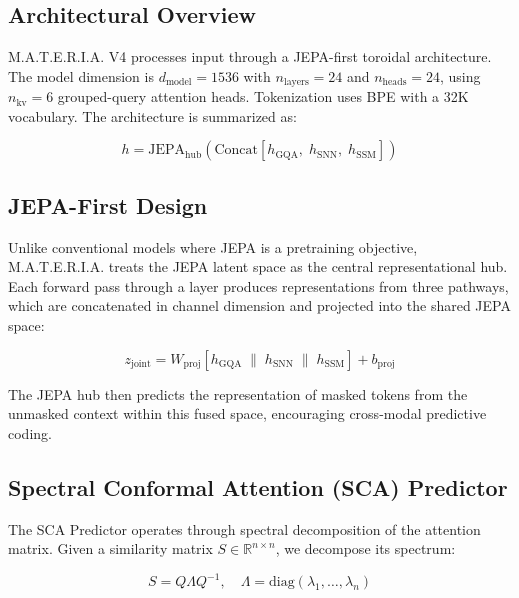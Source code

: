 \documentclass[conference]{IEEEtran}
\newcommand{\materia}{\textsc{M.A.T.E.R.I.A.}}
\begin{document}
\subsection{Architectural Overview}

\materia{} V4 processes input through a JEPA-first toroidal architecture. The model dimension is $d_{\text{model}} = 1536$ with $n_{\text{layers}} = 24$ and $n_{\text{heads}} = 24$, using $n_{\text{kv}} = 6$ grouped-query attention heads. Tokenization uses BPE with a 32K vocabulary. The architecture is summarized as:

\begin{equation}
h = \text{JEPA}_{\text{hub}}\left(\text{Concat}\left[h_{\text{GQA}},\; h_{\text{SNN}},\; h_{\text{SSM}}\right]\right)
\end{equation}

\subsection{JEPA-First Design}

Unlike conventional models where JEPA is a pretraining objective, \materia{} treats the JEPA latent space as the central representational hub. Each forward pass through a layer produces representations from three pathways, which are concatenated in channel dimension and projected into the shared JEPA space:

\begin{equation}
z_{\text{joint}} = W_{\text{proj}}\left[h_{\text{GQA}} \;\|\; h_{\text{SNN}} \;\|\; h_{\text{SSM}}\right] + b_{\text{proj}}
\end{equation}

The JEPA hub then predicts the representation of masked tokens from the unmasked context within this fused space, encouraging cross-modal predictive coding.

\subsection{Spectral Conformal Attention (SCA) Predictor}

The SCA Predictor operates through spectral decomposition of the attention matrix. Given a similarity matrix $S \in \mathbb{R}^{n \times n}$, we decompose its spectrum:

\begin{equation}
S = Q \Lambda Q^{-1}, \quad \Lambda = \text{diag}(\lambda_1, \ldots, \lambda_n)
\end{equation}
\end{document}
